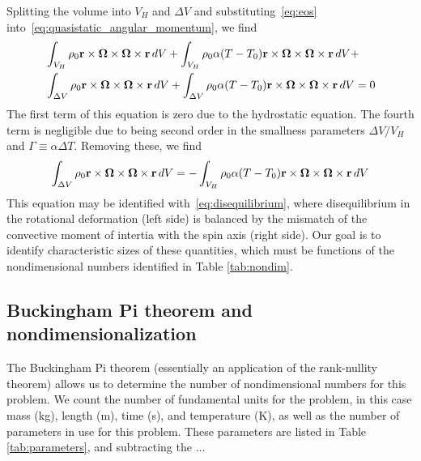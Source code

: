 \documentclass[extra,mreferee]{gji}
\newif\ifdetail
\begin{document}
Splitting the volume into $V_H$ and $\Delta V$ and substituting~\eqref{eq:eos} into~\eqref{eq:quasistatic_angular_momentum}, we find
\begin{equation}
\begin{aligned}
&\int_{V_H} \rho_0 \mathbf{r} \times \mitbf{\Omega} \times \mitbf{\Omega} \times \mathbf{r} \,dV + 
\int_{V_H} \rho_0 \alpha (T-T_0) \mathbf{r} \times \mitbf{\Omega} \times \mitbf{\Omega} \times \mathbf{r} \,dV +  \\
&\int_{\Delta V} \rho_0 \mathbf{r} \times \mitbf{\Omega} \times \mitbf{\Omega} \times \mathbf{r} \,dV + 
\int_{\Delta V} \rho_0 \alpha (T-T_0) \mathbf{r} \times \mitbf{\Omega} \times \mitbf{\Omega} \times \mathbf{r} \,dV = 0  \\
\end{aligned}
\end{equation}
The first term of this equation is zero due to the hydrostatic equation.  
The fourth term is negligible due to being second order in the smallness parameters $\Delta V/V_H$ and $\Gamma\equiv \alpha \Delta T$.
Removing these, we find
\begin{equation}
\begin{aligned}
\int_{\Delta V} \rho_0 \mathbf{r} \times \mitbf{\Omega} \times \mitbf{\Omega} \times \mathbf{r} \,dV = 
-\int_{V_H} \rho_0 \alpha (T-T_0) \mathbf{r} \times \mitbf{\Omega} \times \mitbf{\Omega} \times \mathbf{r} \,dV
\end{aligned}
\end{equation}
This equation may be identified with~\eqref{eq:disequilibrium}, where disequilibrium in the rotational deformation (left side) is balanced by the mismatch of the convective moment of intertia with the spin axis (right side).
Our goal is to identify characteristic sizes of these quantities, which must be functions of the nondimensional numbers identified in Table \ref{tab:nondim}.

\ifdetail
\subsection{Buckingham Pi theorem and nondimensionalization}
\label{sec:buckingham}
The Buckingham Pi theorem (essentially an application of the rank-nullity theorem) allows us to determine the number of nondimensional numbers for this problem.
We count the number of fundamental units for the problem, in this case mass (kg), length (m), time (s), and temperature (K), as well as the number of parameters in use for this problem.  
These parameters are listed in Table \ref{tab:parameters}, and subtracting the ...
\end{document}
